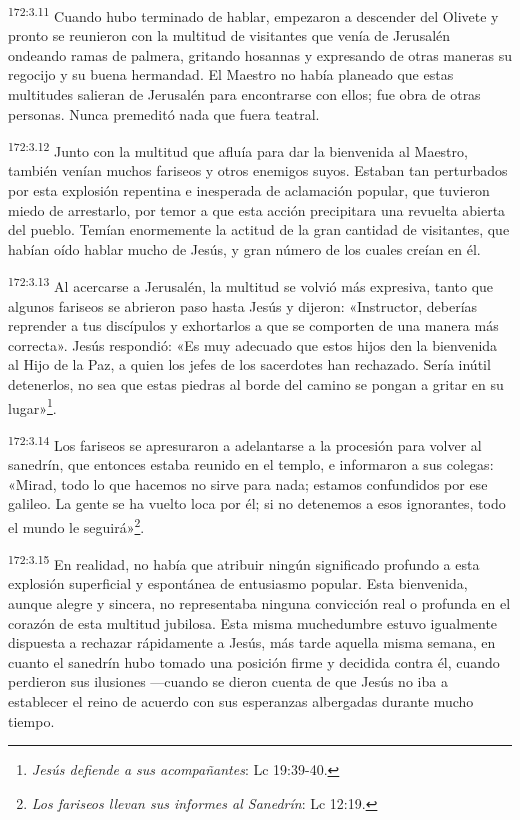 \par
\textsuperscript{172:3.11} Cuando hubo terminado de hablar, empezaron a descender del Olivete y pronto se reunieron con la multitud de visitantes que venía de Jerusalén ondeando ramas de palmera, gritando hosannas y expresando de otras maneras su regocijo y su buena hermandad. El Maestro no había planeado que estas multitudes salieran de Jerusalén para encontrarse con ellos; fue obra de otras personas. Nunca premeditó nada que fuera teatral.

\par
\textsuperscript{172:3.12} Junto con la multitud que afluía para dar la bienvenida al Maestro, también venían muchos fariseos y otros enemigos suyos. Estaban tan perturbados por esta explosión repentina e inesperada de aclamación popular, que tuvieron miedo de arrestarlo, por temor a que esta acción precipitara una revuelta abierta del pueblo. Temían enormemente la actitud de la gran cantidad de visitantes, que habían oído hablar mucho de Jesús, y gran número de los cuales creían en él.

\par
\textsuperscript{172:3.13} Al acercarse a Jerusalén, la multitud se volvió más expresiva, tanto que algunos fariseos se abrieron paso hasta Jesús y dijeron: «Instructor, deberías reprender a tus discípulos y exhortarlos a que se comporten de una manera más correcta». Jesús respondió: «Es muy adecuado que estos hijos den la bienvenida al Hijo de la Paz, a quien los jefes de los sacerdotes han rechazado. Sería inútil detenerlos, no sea que estas piedras al borde del camino se pongan a gritar en su lugar»\footnote{\textit{Jesús defiende a sus acompañantes}: Lc 19:39-40.}.

\par
\textsuperscript{172:3.14} Los fariseos se apresuraron a adelantarse a la procesión para volver al sanedrín, que entonces estaba reunido en el templo, e informaron a sus colegas: «Mirad, todo lo que hacemos no sirve para nada; estamos confundidos por ese galileo. La gente se ha vuelto loca por él; si no detenemos a esos ignorantes, todo el mundo le seguirá»\footnote{\textit{Los fariseos llevan sus informes al Sanedrín}: Lc 12:19.}.

\par
\textsuperscript{172:3.15} En realidad, no había que atribuir ningún significado profundo a esta explosión superficial y espontánea de entusiasmo popular. Esta bienvenida, aunque alegre y sincera, no representaba ninguna convicción real o profunda en el corazón de esta multitud jubilosa. Esta misma muchedumbre estuvo igualmente dispuesta a rechazar rápidamente a Jesús, más tarde aquella misma semana, en cuanto el sanedrín hubo tomado una posición firme y decidida contra él, cuando perdieron sus ilusiones ---cuando se dieron cuenta de que Jesús no iba a establecer el reino de acuerdo con sus esperanzas albergadas durante mucho tiempo.

